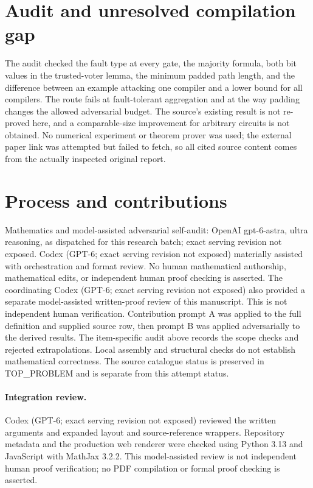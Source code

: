 \documentclass[11pt]{article}
\begin{document}
\section{Audit and unresolved compilation gap}
The audit checked the fault type at every gate, the majority
formula, both bit values in the trusted-voter lemma, the minimum
padded path length, and the difference between an example
attacking one compiler and a lower bound for all compilers.
The route fails at fault-tolerant aggregation and at the way
padding changes the allowed adversarial budget. The source's
existing result is not re-proved here, and a comparable-size
improvement for arbitrary circuits is not obtained. No numerical
experiment or theorem prover was used; the external paper link
was attempted but failed to fetch, so all cited source content
comes from the actually inspected original report.

\section{Process and contributions}
Mathematics and model-assisted adversarial self-audit: OpenAI gpt-6-astra, ultra reasoning, as dispatched for this research batch; exact serving revision not exposed. Codex (GPT-6; exact serving revision not exposed) materially assisted with orchestration and format review. No human mathematical authorship, mathematical edits, or independent human proof checking is asserted.
The coordinating Codex (GPT-6; exact serving revision not exposed) also provided a separate model-assisted written-proof review of this manuscript. This is not independent human verification.
Contribution prompt A was applied to the full definition and supplied source row, then prompt B was applied adversarially to the derived results. The item-specific audit above records the scope checks and rejected extrapolations. Local assembly and structural checks do not establish mathematical correctness. The source catalogue status is preserved in TOP\_PROBLEM and is separate from this attempt status.
\paragraph{Integration review.} Codex (GPT-6; exact serving revision not exposed) reviewed the written arguments and expanded layout and source-reference wrappers. Repository metadata and the production web renderer were checked using Python 3.13 and JavaScript with MathJax 3.2.2. This model-assisted review is not independent human proof verification; no PDF compilation or formal proof checking is asserted.
\end{document}
